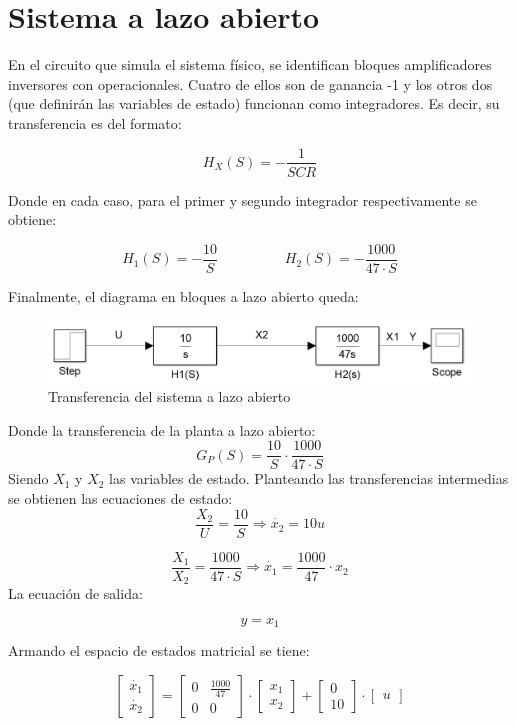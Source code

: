 \documentclass{article}
\begin{document}
\newgeometry{} %



\tableofcontents
\newpage

\section{Sistema a lazo abierto}

En el circuito que simula el sistema físico, se identifican bloques amplificadores inversores con operacionales. Cuatro de ellos son de ganancia -1 y los otros dos (que definirán las variables de estado) funcionan como integradores. Es decir, su transferencia es del formato:

\[
H_X(S) = -\frac{1}{SCR}
\]

Donde en cada caso, para el primer y segundo integrador respectivamente se obtiene:

\[
H_1(S) = -\frac{10}{S} \hspace{2cm} H_2(S) = -\frac{1000}{47 \cdot S}
\]

Finalmente, el diagrama en bloques a lazo abierto queda:

\begin{figure}[H]
\centering
\includegraphics[width=0.7\linewidth]{Imagenes/HLazoAbierto.png}
\caption{Transferencia del sistema a lazo abierto}
\label{fig:diagramaOpen}
\end{figure}

Donde la transferencia de la planta a lazo abierto:
\[
G_P(S) = \frac{10}{S} \cdot \frac{1000}{47 \cdot S}
\]
Siendo $X_1$ y $X_2$ las variables de estado. Planteando las transferencias intermedias se obtienen las ecuaciones de estado:
\[
\frac{X_2}{U} = \frac{10}{S} \Longrightarrow \dot{x_2} = 10u
\]

\[
\frac{X_1}{X_2} = \frac{1000}{47 \cdot S} \Longrightarrow \dot{x_1} = \frac{1000}{47} \cdot x_2
\]
La ecuación de salida:

\[
y = x_1
\]

Armando el espacio de estados matricial se tiene:

\[
\begin{bmatrix}
\dot{x_1} \\
\dot{x_2} 
\end{bmatrix}
=
\begin{bmatrix}
0 & \frac{1000}{47} \\
0 & 0 
\end{bmatrix}
\cdot
\begin{bmatrix}
x_1 \\
x_2 
\end{bmatrix}
+
\begin{bmatrix}
0 \\
10 
\end{bmatrix}
\cdot
\begin{bmatrix}
u
\end{bmatrix}
\]
\end{document}
